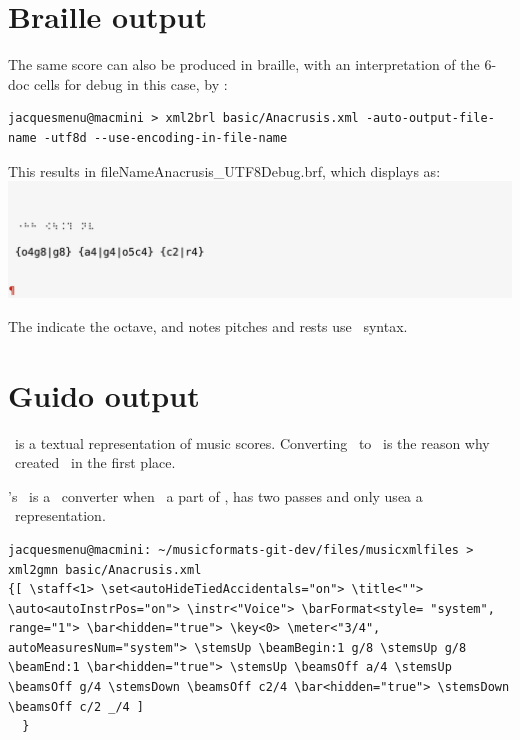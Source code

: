 \section{Braille output}

The same score can also be produced in braille, with an interpretation of the 6-doc cells for debug in this case, by \xmlToBrl:
\begin{lstlisting}[language=Terminal]
jacquesmenu@macmini > xml2brl basic/Anacrusis.xml -auto-output-file-name -utf8d --use-encoding-in-file-name
\end{lstlisting}

This results in fileName{Anacrusis_UTF8Debug.brf}, which displays as:\\
\includegraphics[scale=1]{../graphics/Anacrusis_Braille.png}

The  indicate the octave, and notes pitches and rests use \lily\ syntax.


\section{Guido output}

\guido\ is a textual representation of music scores. Converting \mxml\ to \guido\ is the reason why \fober\ created \libmusicxml\ in the first place.

\mf's \xmlToGmn\ is a \multiPass\ converter when \xmlToGuido\, a part of \libmusicxml, has two passes and only usea a \mxsrRepr\ representation.

\begin{lstlisting}[language=Terminal]
jacquesmenu@macmini: ~/musicformats-git-dev/files/musicxmlfiles > xml2gmn basic/Anacrusis.xml 
{[ \staff<1> \set<autoHideTiedAccidentals="on"> \title<""> \auto<autoInstrPos="on"> \instr<"Voice"> \barFormat<style= "system", range="1"> \bar<hidden="true"> \key<0> \meter<"3/4", autoMeasuresNum="system"> \stemsUp \beamBegin:1 g/8 \stemsUp g/8 \beamEnd:1 \bar<hidden="true"> \stemsUp \beamsOff a/4 \stemsUp \beamsOff g/4 \stemsDown \beamsOff c2/4 \bar<hidden="true"> \stemsDown \beamsOff c/2 _/4 ]
  }
\end{lstlisting}

